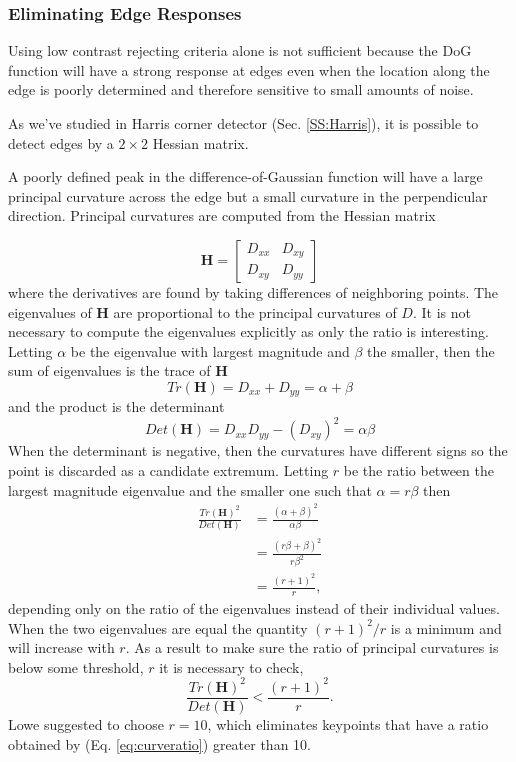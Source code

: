\documentclass{article}
\begin{document}
\subsubsection{Eliminating Edge Responses}\label{SSS:EER}
Using low contrast rejecting criteria alone is not sufficient because the DoG function will have a strong response at edges even when the location along the edge is poorly determined and therefore sensitive to small amounts of noise.  

As we've studied in Harris corner detector (Sec. \ref{SS:Harris}), it is possible to detect edges by a $2 \times 2 $ Hessian matrix. 

A poorly defined peak in the difference-of-Gaussian function will have a large principal curvature across the edge but a small curvature in the perpendicular direction. 
Principal curvatures are computed from the Hessian matrix

\begin{equation}
  \mathbf{H} = \begin{bmatrix}
    D_{xx} & D_{xy}\\
    D_{xy} & D_{yy}
  \end{bmatrix}
\end{equation}
where the derivatives are found by taking differences of neighboring points.  The eigenvalues of $\mathbf{H}$ are proportional to the principal curvatures of $D$.  It is not necessary to compute the eigenvalues explicitly as only the ratio is interesting.  Letting $\alpha$ be the eigenvalue with largest magnitude and $\beta$ the smaller, then the sum of eigenvalues is the trace of $\mathbf{H}$ 
\begin{equation}
  Tr(\mathbf{H})= D_{xx}+D_{yy}=\alpha + \beta
\end{equation}
and the product is the determinant
\begin{equation}
  Det(\mathbf{H})= D_{xx}D_{yy} - (D_{xy})^2=\alpha\beta
\end{equation}
When the determinant is negative, then the curvatures have different signs so the point is discarded as a candidate extremum.  Letting $r$ be the ratio between the largest magnitude eigenvalue and the smaller one such that $\alpha = r\beta$ then
\begin{align}
  \frac{Tr(\mathbf{H})^2}{Det(\mathbf{H})} &= \frac{(\alpha + \beta)^2}{\alpha \beta}\\
  &= \frac{(r\beta + \beta)^2}{r\beta^2}\\
  &= \frac{(r+1)^2}{r},
\end{align}
depending only on the ratio of the eigenvalues instead of their individual values.  When the two eigenvalues are equal the quantity $(r+1)^2/r$ is a minimum and will increase with $r$.  As a result to make sure the ratio of principal curvatures is below some threshold, $r$ it is necessary to check,
\begin{equation}
  \frac{Tr(\mathbf{H})^2}{Det(\mathbf{H})} < \frac{(r+1)^2}{r}. \label{eq:curveratio}
\end{equation}
Lowe suggested to choose $r=10$, which eliminates keypoints that have a ratio obtained by (Eq. \ref{eq:curveratio}) greater than 10. 
\end{document}
